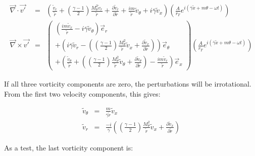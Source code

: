 \documentclass[12pt]{article}
\begin{document}
\begin{eqnarray}
\vec{\nabla} \cdot \vec{v'} &=&
\left(
\frac{ \widetilde{v}_r}{\widetilde{r}}
+
\left(
\frac{\gamma-1}{2}
\right)
\frac{
M_{\theta}^2
 \widetilde{v}_r
}{\widetilde{r}}
+ \frac{\partial \widetilde{v}_r}{\partial \widetilde{r}}
+ \frac{i m}{\widetilde{r}} \widetilde{v}_{\theta}
+ i \overline{\gamma} \widetilde{v}_x
\right)
\left(
\frac{A}{r_T}
e^{i \left(\overline{\gamma} \widetilde{x} + m \theta - \omega t \right)}
\right)
\nonumber
\\
\vec{\nabla} \times \vec{v'}
&=&
\left(
\begin{array}{r}
\left(
\frac{i m \widetilde{v}_x}{\widetilde{r}}
-
i \overline{\gamma} \widetilde{v}_{\theta}
\right) \vec{e}_r
\\
+\left(
i \overline{\gamma} \widetilde{v}_r
-
\left(
\left(\frac{\gamma-1}{2} \right)
\frac{M_{\theta}^2}{\widetilde{r}}
\widetilde{v}_x
+
\frac{\partial \widetilde{v}_x}{\partial \widetilde{r}} 
\right)
\right) \vec{e}_{\theta}
\\
+
\left(
\frac{  \widetilde{v}_{\theta}}{\widetilde{r}}
+ 
\left(
\left(\frac{\gamma-1}{2} \right)
\frac{M_{\theta}^2}{\widetilde{r}}
\widetilde{v}_{\theta}
+
\frac{\partial \widetilde{v}_{\theta}}{\partial \widetilde{r}} 
\right)
-\frac{i m \widetilde{v}_r}{\widetilde{r}}
\right) \vec{e}_x
\end{array}
\right)
\left(
\frac{A}{r_T}
e^{i \left(\overline{\gamma} \widetilde{x} + m \theta - \omega t \right)}
\right)
\nonumber
\end{eqnarray}

If all three vorticity components are zero, the perturbations will
be irrotational.  From the first two velocity components, this gives:

\begin{eqnarray}
\widetilde{v}_{\theta}
&=&
\frac{m}{\overline{\gamma} \widetilde{r}} \widetilde{v}_{x}
\nonumber
\\
\widetilde{v}_r
&=&
\frac{-i}{ \overline{\gamma}}
\left(
\left(\frac{\gamma-1}{2} \right)
\frac{M_{\theta}^2}{\widetilde{r}}
\widetilde{v}_x
+
\frac{\partial \widetilde{v}_x}{\partial \widetilde{r}} 
\right)
\nonumber
\end{eqnarray}

As a test, the last vorticity component is:
\end{document}
